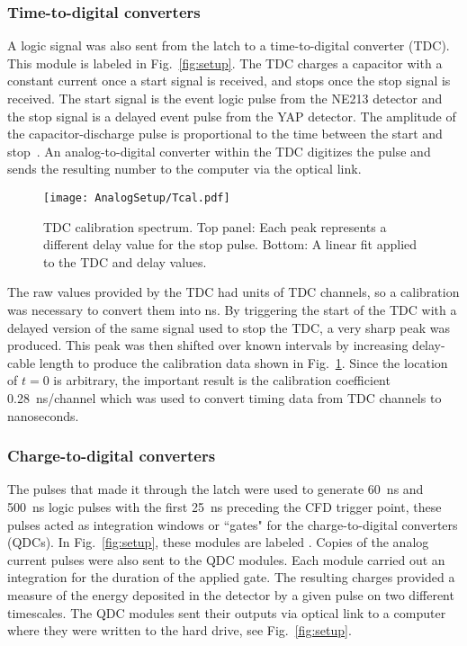 \documentclass[main.tex]{subfiles}
\begin{document}
\subsubsection{Time-to-digital converters}
A logic signal was also sent from the latch to a time-to-digital converter (TDC). This module is labeled  in Fig.~\ref{fig:setup}. The TDC charges a capacitor with a constant current once a start signal is received, and stops once the stop signal is received. The start signal is the event logic pulse from the NE213 detector and the stop signal is a delayed event pulse from the YAP detector. The amplitude of the capacitor-discharge pulse is proportional to the time between the start and stop~\cite{CAENTDC}. An analog-to-digital converter within the TDC digitizes the pulse and sends the resulting number to the computer via the optical link.
\begin{figure}[h]
	\centering
    	\texttt{[image: AnalogSetup/Tcal.pdf]}
        \caption[TDC calibration spectrum.]{TDC calibration spectrum. Top panel: Each peak represents a different delay value for the stop pulse. Bottom: A linear fit applied to the TDC and delay values.}
	    \label{fig:Tcal} 
\end{figure}

The raw values provided by the TDC had units of TDC channels, so a calibration was necessary to convert them into ns. By triggering the start of the TDC with a delayed version of the same signal used to stop the TDC, a very sharp peak was produced. This peak was then shifted over known intervals by increasing delay-cable length to produce the calibration data shown in Fig.~\ref{fig:Tcal}. Since the location of $t=0$ is arbitrary, the important result is the calibration coefficient \SI{0.28}{\nano\second/channel} which was used to convert timing data from TDC channels to nanoseconds.

\subsubsection{Charge-to-digital converters}\label{sec:Ecal_A}
The pulses that made it through the latch were used to generate \SI{60}{\ns} and \SI{500}{\ns} logic pulses with the first \SI{25}{\ns} preceding the CFD trigger point, these pulses acted as integration windows or ``gates" for the charge-to-digital converters (QDCs). In Fig.~\ref{fig:setup}, these modules are labeled . Copies of the analog current pulses were also sent to the QDC modules. Each module carried out an integration for the duration of the applied gate. The resulting charges provided a measure of the energy deposited in the detector by a given pulse on two different timescales. The QDC modules sent their outputs via optical link to a computer where they were written to the hard drive, see Fig.~\ref{fig:setup}.
\end{document}
